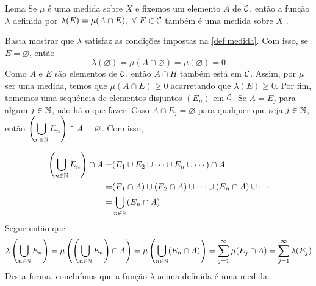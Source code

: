 \begin{env}{Lema}
	\label{lem:medida-da-intersecao-de-um-fixado}
	Se $\mu$ é uma medida sobre $X$ e fixemos um elemento $A$ de $\operatorname{\mathcal{C}}$, então a função $\lambda$ definida por $\lambda(E) = \mu(A\cap E), \ \forall\  E \in \cc$ também é uma medida sobre $X$ \cite{bartle}.
\end{env}
\begin{prova}
	Basta mostrar que $\lambda$ satisfaz as condições impostas na  \ref{def:medida}.
	Com isso, se $E = \varnothing$, então
	$$
	\lambda(\varnothing) = \mu(A \cap \varnothing) = \mu(\varnothing) = 0
	$$
	Como $A$ e $E$ são elementos de $\operatorname{\mathcal{C}}$, então $A \cap H$ também está em $\operatorname{\mathcal{C}}$.
	Assim, por $\mu$ ser uma medida, temos que $\mu(A\cap E) \geq 0$ acarretando que $\lambda(E) \geq 0$.
	Por fim, tomemos uma sequência de elementos disjuntos $(E_n)$ em $\operatorname{\mathcal{C}}$.
	Se $A = E_j$ para algum $j \in \operatorname{\mathbb{N}}$, não há o que fazer.
	Caso $A \cap E_j = \varnothing$ para qualquer que seja $j \in \operatorname{\mathbb{N}}$, então $\displaystyle \left( \bigcup_{n \in \operatorname{\mathbb{N}}} E_n\right) \cap A = \varnothing$.
	Com isso, 
	
	\begin{align*}
		\left( \bigcup_{n \in \operatorname{\mathbb{N}}} E_n\right) \cap A
		= &
		(E_1 \cup E_2 \cup \cdots \cup E_n \cup \cdots) \cap A\\
		= &
		(E_1 \cap A )\cup (E_2 \cap A) \cup \cdots \cup (E_n\cap A) \cup \cdots \\
		= &
		\bigcup_{n \in \operatorname{\mathbb{N}}} (E_n\cap A)    
	\end{align*}
	Segue então que
	$$
	\lambda\left( \bigcup_{n \in \operatorname{\mathbb{N}}} E_n\right)
	=
	\mu\left(\left( \bigcup_{n \in \operatorname{\mathbb{N}}} E_n\right) \cap A\right)
	=
	\mu\left( \bigcup_{n \in \operatorname{\mathbb{N}}} (E_n\cap A) \right)
	=
	\sum_{j = 1}^\infty \mu(E_j \cap A)
	= 
	\sum_{j = 1}^\infty \lambda(E_j)
	$$
	Desta forma, concluímos que a função $\lambda$ acima definida é uma medida.
\end{prova}

